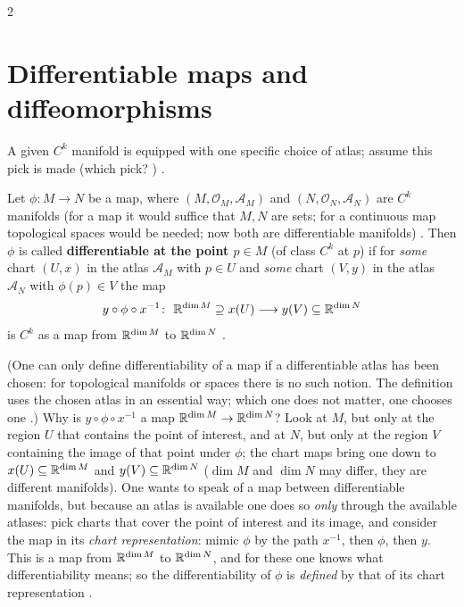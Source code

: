 \begin{paracol}{2}
\section{Differentiable maps and diffeomorphisms}\label{sec:df-maps}

A given $C^k$ manifold is equipped with one specific choice of atlas; assume this pick is made (which pick? ) .
\begin{definition}\label{def:df-map}
Let $\phi\colon M\to N$ be a map, where $(M,\mathcal O_M,\mathcal A_M)$ and $(N,\mathcal O_N,\mathcal A_N)$ are $C^k$ manifolds (for a map it would suffice that $M,N$ are sets; for a continuous map topological spaces would be needed; now both are differentiable manifolds)
. Then $\phi$ is called \textbf{differentiable at the point $p\in M$} (of class $C^k$ at $p$) if for \emph{some} chart $(U,x)$ in the atlas $\mathcal A_M$ with $p\in U$ and \emph{some} chart $(V,y)$ in the atlas $\mathcal A_N$ with $\phi(p)\in V$ the map
\[
  y\circ\phi\circ x^{-1}\colon\ \R^{\dim M}\supseteq x(U)\longrightarrow y(V)\subseteq\R^{\dim N}
\]
is $C^k$ as a map from $\mathbb{R}^{\dim M}$ to $\mathbb{R}^{\dim N}$ .
\end{definition}
(One can only define differentiability of a map if a differentiable atlas has been chosen: for topological manifolds or spaces there is no such notion. The definition uses the chosen atlas in an essential way; which one does not matter, one chooses one .)
Why is $y\circ\phi\circ x^{-1}$ a map $\mathbb{R}^{\dim M}\to\mathbb{R}^{\dim N}$? Look at $M$, but only at the region $U$ that contains the point of interest, and at $N$, but only at the region $V$ containing the image of that point under $\phi$; the chart maps bring one down to $x(U)\subseteq\mathbb{R}^{\dim M}$
and $y(V)\subseteq\mathbb{R}^{\dim N}$ ($\dim M$ and $\dim N$ may differ, they are different manifolds). One wants to speak of a map between differentiable manifolds, but because an atlas is available one does so \emph{only} through the available atlases: pick charts that cover the point of interest and its
image, and consider the map in its \emph{chart representation}: mimic $\phi$ by the path $x^{-1}$, then $\phi$, then $y$. This is a map from $\mathbb{R}^{\dim M}$ to $\mathbb{R}^{\dim N}$, and for these one knows what differentiability means; so the differentiability of $\phi$ is \emph{defined} by that of its chart representation
.


\end{paracol}
